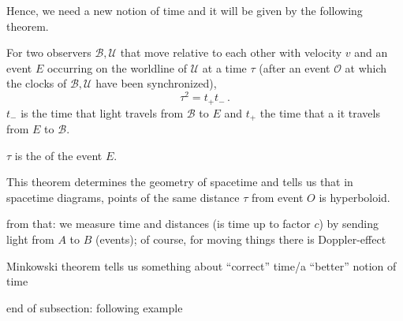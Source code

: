 Hence, we need a new notion of time and it will be given by the following theorem.


\begin{thm}
For two observers $\mathcal{B}, \mathcal{U}$ that move relative to each other with velocity $v$ and an event $E$ occurring on the worldline of $\mathcal{U}$ at a time $\tau$ (after an event $\mathcal{O}$ at which the clocks of $\mathcal{B}, \mathcal{U}$ have been synchronized),
\begin{equation}
\tau^2 = t_+ t_- \, .
\end{equation}
$t_-$ is the time that light travels from $\mathcal{B}$ to $E$ and $t_+$ the time that a it travels from $E$ to $\mathcal{B}$.
\end{thm}

$\tau$ is the  of the event $E$.

This theorem determines the geometry of spacetime and tells us that in spacetime diagrams, points of the same distance $\tau$ from event $O$ is hyperboloid.



from that: we measure time and distances (is time up to factor $c$) by sending light from $A$ to $B$ (events); of course, for moving things there is Doppler-effect

Minkowski theorem tells us something about \enquote{correct} time/a \enquote{better} notion of time


end of subsection: following example

